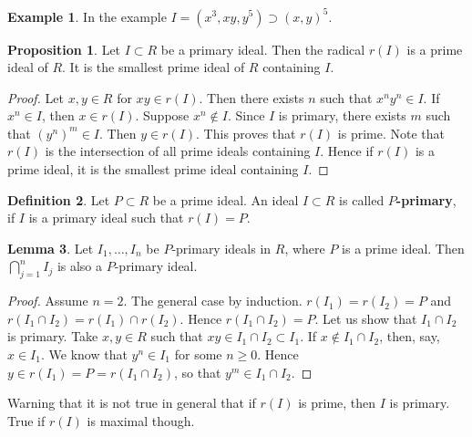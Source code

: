 \documentclass{article}
\newcommand{\rb}[1]{\left( #1 \right)}
\theoremstyle{definition}\newtheorem{definition}{Definition}[section]
\theoremstyle{definition}\newtheorem{remark}[definition]{Remark}
\theoremstyle{definition}\newtheorem*{example}{Example}
\theoremstyle{definition}\newtheorem*{note}{Note}
\newtheorem{proposition}[definition]{Proposition}
\newtheorem{lemma}[definition]{Lemma}
\begin{document}
\begin{example}
In the example $ I = \rb{x^3, xy, y^5} \supset \rb{x, y}^5 $.
\end{example}

\begin{proposition}
\label{prop:11.3}
Let $ I \subset R $ be a primary ideal. Then the radical $ r\rb{I} $ is a prime ideal of $ R $. It is the smallest prime ideal of $ R $ containing $ I $.
\end{proposition}

\begin{proof}
Let $ x, y \in R $ for $ xy \in r\rb{I} $. Then there exists $ n $ such that $ x^ny^n \in I $. If $ x^n \in I $, then $ x \in r\rb{I} $. Suppose $ x^n \notin I $. Since $ I $ is primary, there exists $ m $ such that $ \rb{y^n}^m \in I $. Then $ y \in r\rb{I} $. This proves that $ r\rb{I} $ is prime. Note that $ r\rb{I} $ is the intersection of all prime ideals containing $ I $. Hence if $ r\rb{I} $ is a prime ideal, it is the smallest prime ideal containing $ I $.
\end{proof}

\begin{definition}
Let $ P \subset R $ be a prime ideal. An ideal $ I \subset R $ is called \textbf{$ P $-primary}, if $ I $ is a primary ideal such that $ r\rb{I} = P $.
\end{definition}

\begin{lemma}
\label{lem:11.4}
Let $ I_1, \dots, I_n $ be $ P $-primary ideals in $ R $, where $ P $ is a prime ideal. Then $ \bigcap_{j = 1}^n I_j $ is also a $ P $-primary ideal.
\end{lemma}

\begin{proof}
Assume $ n = 2 $. The general case by induction. $ r\rb{I_1} = r\rb{I_2} = P $ and $ r\rb{I_1 \cap I_2} = r\rb{I_1} \cap r\rb{I_2} $. Hence $ r\rb{I_1 \cap I_2} = P $. Let us show that $ I_1 \cap I_2 $ is primary. Take $ x, y \in R $ such that $ xy \in I_1 \cap I_2 \subset I_1 $. If $ x \notin I_1 \cap I_2 $, then, say, $ x \in I_1 $. We know that $ y^n \in I_1 $ for some $ n \ge 0 $. Hence $ y \in r\rb{I_1} = P = r\rb{I_1 \cap I_2} $, so that $ y^m \in I_1 \cap I_2 $.
\end{proof}

Warning that it is not true in general that if $ r\rb{I} $ is prime, then $ I $ is primary. True if $ r\rb{I} $ is maximal though.

\end{document}
